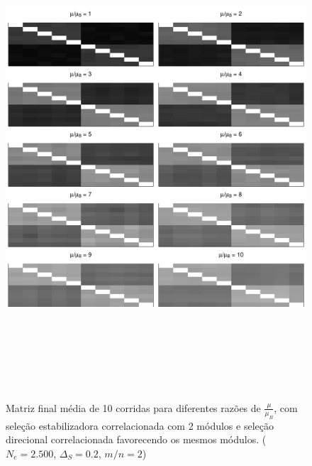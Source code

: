 \begin{figure}[htbp]
  \centering
  \includegraphics[width=150mm, height=180mm]{figuras/MatBDirecRMu}
   \caption{Matriz final média de 10 corridas para diferentes razões de
   $\frac{\mu}{\mu_B}$, com seleção estabilizadora correlacionada com 2
   módulos e seleção direcional correlacionada favorecendo os mesmos
   módulos. ($N_e=2.500$, $\Delta_S=0.2$, $m/n=2$)}
  \label{MatBDirecional-RMu}
\end{figure}



